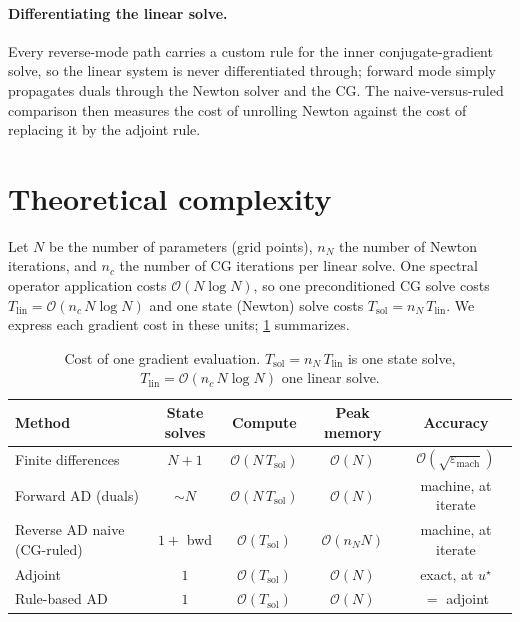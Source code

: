 \documentclass[11pt,a4paper]{article}
\begin{document}
\paragraph{Differentiating the linear solve.}
Every reverse-mode path carries a custom rule for the inner conjugate-gradient
solve, so the linear system is never differentiated through; forward mode simply
propagates duals through the Newton solver and the CG. The naive-versus-ruled comparison then
measures the cost of unrolling Newton against the cost of replacing it by the
adjoint rule.

\section{Theoretical complexity}
\label{sec:complexity}

Let $N$ be the number of parameters (grid points), $n_N$ the number of Newton
iterations, and $n_c$ the number of CG iterations per linear solve. One spectral
operator application costs $\mathcal O(N\log N)$, so one preconditioned CG solve
costs $T_{\mathrm{lin}}=\mathcal O(n_c\,N\log N)$ and one state (Newton) solve
costs $T_{\mathrm{sol}}=n_N\,T_{\mathrm{lin}}$. We express each gradient cost in
these units; \cref{tab:complexity} summarizes.

\begin{table}[h]
  \centering
  \caption{Cost of one gradient evaluation. $T_{\mathrm{sol}}=n_N\,T_{\mathrm{lin}}$
    is one state solve, $T_{\mathrm{lin}}=\mathcal O(n_c\,N\log N)$ one linear solve.}
  \label{tab:complexity}
  \begin{tabular}{lcccc}
    \toprule
    Method & State solves & Compute & Peak memory & Accuracy \\
    \midrule
    Finite differences          & $N{+}1$      & $\mathcal O(N\,T_{\mathrm{sol}})$ & $\mathcal O(N)$      & $\mathcal O(\sqrt{\varepsilon_{\mathrm{mach}}})$ \\
    Forward AD (duals)           & $\sim N$     & $\mathcal O(N\,T_{\mathrm{sol}})$ & $\mathcal O(N)$      & machine, at iterate \\
    Reverse AD naive (CG-ruled)  & $1 + $ bwd   & $\mathcal O(T_{\mathrm{sol}})$    & $\mathcal O(n_N N)$  & machine, at iterate \\
    Adjoint                      & $1$          & $\mathcal O(T_{\mathrm{sol}})$    & $\mathcal O(N)$      & exact, at $u^\star$ \\
    Rule-based AD                & $1$          & $\mathcal O(T_{\mathrm{sol}})$    & $\mathcal O(N)$      & $=$ adjoint \\
    \bottomrule
  \end{tabular}
\end{table}
\end{document}
